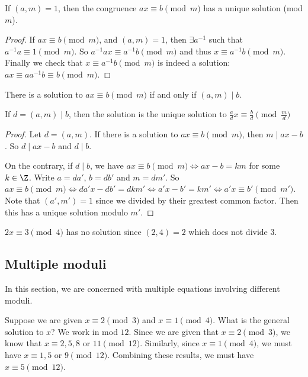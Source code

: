 \documentclass[a4paper]{article}
\begin{document}
\begin{cor}
  If $(a, m) = 1$, then the congruence $ax \equiv b\pmod m$ has a unique solution (mod $m$).
\end{cor}

\begin{proof}
  If $ax\equiv b\pmod m$, and $(a, m) = 1$, then $\exists a^{-1}$ such that $a^{-1}a\equiv 1\pmod m$. So $a^{-1}ax\equiv a^{-1}b\pmod m$ and thus $x\equiv a^{-1}b\pmod m$. Finally we check that $x \equiv a^{-1}b \pmod m$ is indeed a solution: $ax \equiv aa^{-1}b \equiv b \pmod m$.
\end{proof}

\begin{prop}
  There is a solution to $ax \equiv b\pmod m$ if and only if $(a, m) \mid b$.

  If $d = (a, m) \mid b$, then the solution is the unique solution to $\frac{a}{d}x \equiv \frac{b}{d} \pmod {\frac{m}{d}}$
\end{prop}

\begin{proof}
  Let $d = (a, m)$. If there is a solution to $ax \equiv b\pmod m$, then $m \mid ax - b$. So $d \mid ax - b$ and $d \mid b$.

  On the contrary, if $d \mid b$, we have $ax \equiv b\pmod m \Leftrightarrow ax - b = km$ for some $k\in \Z$. Write $a = da'$, $b = db'$ and $m = dm'$. So $ax\equiv b\pmod m \Leftrightarrow da'x - db' = dkm'\Leftrightarrow a'x - b' = km'\Leftrightarrow a'x \equiv b'\pmod {m'}$. Note that $(a', m') = 1$ since we divided by their greatest common factor. Then this has a unique solution modulo $m'$.
\end{proof}

\begin{eg}
  $2x \equiv 3 \pmod 4$ has no solution since $(2, 4) = 2$ which does not divide $3$.
\end{eg}

\subsection{Multiple moduli}
In this section, we are concerned with multiple equations involving different moduli.

Suppose we are given $x \equiv 2\pmod 3$ and $x\equiv 1\pmod 4$. What is the general solution to $x$? We work in mod $12$. Since we are given that $x\equiv 2\pmod 3$, we know that $x \equiv 2, 5, 8$ or $11 \pmod {12}$. Similarly, since $x \equiv 1 \pmod 4$, we must have $x \equiv 1, 5$ or $9\pmod {12}$. Combining these results, we must have $x \equiv 5\pmod {12}$.
\end{document}
